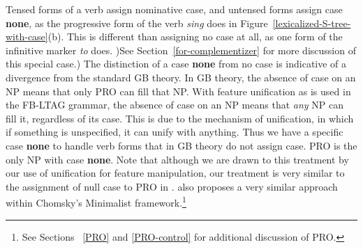 Tensed forms of a verb assign nominative case, and untensed forms
assign case {\bf none}, as the progressive form of the verb {\it sing}
does in Figure~\ref{lexicalized-S-tree-with-case}(b). This is
different than assigning no case at all, as one form of the infinitive
marker {\it to} does. )See Section~\ref{for-complementizer} for more
discussion of this special case.) The distinction of a case {\bf none}
from no case is indicative of a divergence from the standard GB
theory.  In GB theory, the absence of case on an NP means that only
PRO can fill that NP.  With feature unification as is used in the
FB-LTAG grammar, the absence of case on an NP means that {\em any\/}
NP can fill it, regardless of its case.  This is due to the mechanism
of unification, in which if something is unspecified, it can unify
with anything.  Thus we have a specific case {\bf none} to handle verb
forms that in GB theory do not assign case.  PRO is the only NP with
case {\bf none}.  Note that although we are drawn to this treatment by
our use of unification for feature manipulation, our treatment is very
similar to the assignment of null case to PRO in
\cite{ChomskyLasnik93}.  \cite{watanabe93} also proposes a very similar 
approach within Chomsky's Minimalist framework.\footnote{See Sections~
\ref{PRO} and \ref{PRO-control}
for additional discussion of PRO.}


